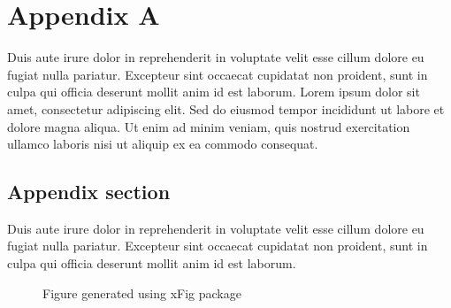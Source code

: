 %
\chapter{Appendix A}
\label{app:a}
%
Duis aute irure dolor in reprehenderit in voluptate velit esse cillum dolore eu fugiat nulla pariatur.
Excepteur sint occaecat cupidatat non proident, sunt in culpa qui officia deserunt mollit anim id est laborum.
Lorem ipsum dolor sit amet, consectetur adipiscing elit. 
Sed do eiusmod tempor incididunt ut labore et dolore magna aliqua. 
Ut enim ad minim veniam, quis nostrud exercitation ullamco laboris nisi ut aliquip ex ea commodo consequat.
%
%
%
\section{Appendix section}
\label{app:sec:A}
%
%
%
Duis aute irure dolor in reprehenderit in voluptate velit esse cillum dolore eu fugiat nulla pariatur.
Excepteur sint occaecat cupidatat non proident, sunt in culpa qui officia deserunt mollit anim id est laborum.
%
\begin{figure}[H]
\begin{center}
\scalebox{0.8}{}
\end{center}
\caption{Figure generated using xFig package}
\label{fig:Appendix:cyl}
\end{figure}
%
%

